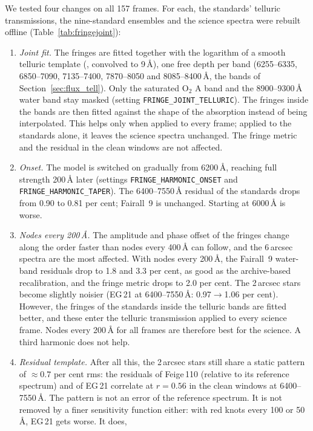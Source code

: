 We tested four changes on all 157 frames. For each, the standards' telluric transmissions, the nine-standard
ensembles and the science spectra were rebuilt offline (Table~\ref{tab:fringejoint}):
\begin{enumerate}
\item \textit{Joint fit.} The fringes are fitted together with the logarithm of a smooth telluric template
(\citealt{Matheson2000}, convolved to 9\,\AA), one free depth per band (6255--6335, 6850--7090, 7135--7400,
7870--8050 and 8085--8400\,\AA, the bands of Section~\ref{sec:flux_tell}). Only the saturated O$_2$ A band and the
8900--9300\,\AA{} water band stay masked (setting \texttt{FRINGE\_JOINT\_TELLURIC}). The fringes inside the bands
are then fitted against the shape of the absorption instead of being interpolated. This helps only when applied to
every frame; applied to the standards alone, it leaves the science spectra unchanged. The fringe metric and the
residual in the clean windows are not affected.
\item \textit{Onset.} The model is switched on gradually from 6200\,\AA, reaching full strength 200\,\AA{} later
(settings \texttt{FRINGE\_HARMONIC\_ONSET} and \texttt{FRINGE\_HARMONIC\_TAPER}). The 6400--7550\,\AA{} residual of
the standards drops from 0.90 to 0.81 per cent; Fairall~9 is unchanged. Starting at 6000\,\AA{} is worse.
\item \textit{Nodes every 200\,\AA.} The amplitude and phase offset of the fringes change along the order faster
than nodes every 400\,\AA{} can follow, and the 6\,arcsec spectra are the most affected. With nodes every 200\,\AA,
the Fairall~9 water-band residuals drop to 1.8 and 3.3 per cent, as good as the archive-based recalibration, and the
fringe metric drops to 2.0 per cent. The 2\,arcsec stars become slightly noisier (EG\,21 at 6400--7550\,\AA:
0.97$\rightarrow$1.06 per cent). However, the fringes of the standards inside the telluric bands are fitted better,
and these enter the telluric transmission applied to every science frame. Nodes every 200\,\AA{} for all frames are
therefore best for the science. A third harmonic does not help.
\item \textit{Residual template.} After all this, the 2\,arcsec stars still share a static pattern of
$\approx0.7$ per cent rms: the residuals of Feige\,110 (relative to its reference spectrum) and of EG\,21 correlate at
$r=0.56$ in the clean windows at 6400--7550\,\AA. The pattern is not an error of the reference spectrum. It is not
removed by a finer sensitivity function either: with red knots every 100 or 50\,\AA, EG\,21 gets worse. It does,

\end{enumerate}
